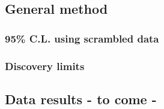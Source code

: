 \subsection{General method}
\subsubsection{95\% C.L. using scrambled data}
\subsubsection{Discovery limits}
\subsection{Data results - to come -}

